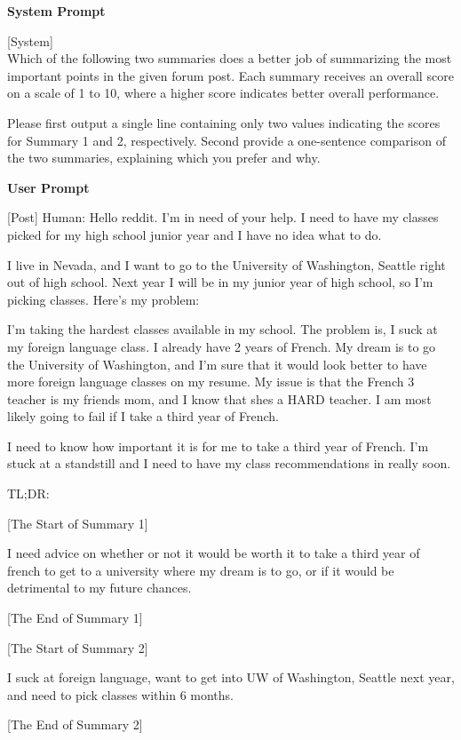 \begin{tcolorbox}[colback=green!5!white,colframe=green!75!black, title=GPT-4 prompt for Evaluating TL;DR Summarization]
  \textbf{System Prompt}
  
[System] \\
Which of the following two summaries does a better job of summarizing the most important points in the given forum post. Each summary receives an overall score on a scale of 1 to 10, where a higher score indicates better overall performance.

Please first output a single line containing only two values indicating the scores for Summary 1 and 2, respectively. Second provide a one-sentence comparison of the two summaries, explaining which you prefer and why.

  \tcblower
  \textbf{User Prompt}
  
  [Post]
Human: Hello reddit. I'm in need of your help. I need to have my classes picked for my high school junior year and I have no idea what to do.

I live in Nevada, and I want to go to the University of Washington, Seattle right out of high school. Next year I will be in my junior year of high school, so I'm picking classes. Here's my problem:

I'm taking the hardest classes available in my school. The problem is, I suck at my foreign language class. I already have 2 years of French. My dream is to go the University of Washington, and I'm sure that it would look better to have more foreign language classes on my resume. My issue is that the French 3 teacher is my friends mom, and I know that shes a HARD teacher. I am most likely going to fail if I take a third year of French.

I need to know how important it is for me to take a third year of French. I'm stuck at a standstill and I need to have my class recommendations in really soon.

TL;DR: 

\bigskip

  [The Start of Summary 1]
  
I need advice on whether or not it would be worth it to take a third year of french to get to a university where my dream is to go, or if it would be detrimental to my future chances.

[The End of Summary 1]
\bigskip

[The Start of Summary 2]

I suck at foreign language, want to get into UW of Washington, Seattle next year, and need to pick classes within 6 months.

[The End of Summary 2]

  
  
\end{tcolorbox}
\vspace{-18em}

